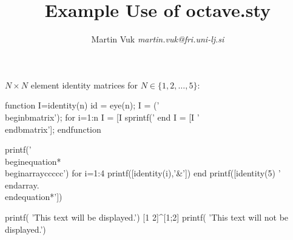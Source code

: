 \documentclass{article}
\title{Example Use of octave.sty}
\author{Martin Vuk \emph{martin.vuk@fri.uni-lj.si}}
\begin{document}
\maketitle

$N \times N$ element identity matrices for $N \in \{1,2,\ldots,5\}$:

\begin{octave}
function I=identity(n)
id = eye(n);
I = ('\\begin{bmatrix}\n');
for i=1:n
  I = [I sprintf('%
end
I = [I '\\end{bmatrix}\n'];
endfunction

printf('\\begin{equation*}\n\\begin{array}{ccccc}\n')
for i=1:4
  printf([identity(i),'&'])
end
printf([identity(5) '\n\\end{array}.\n\\end{equation*}'])
\end{octave}

\begin{octave}
printf( 'This text will be displayed.')
[1 2]^[1;2]
printf( 'This text will not be displayed.')
\end{octave}
\end{document}
